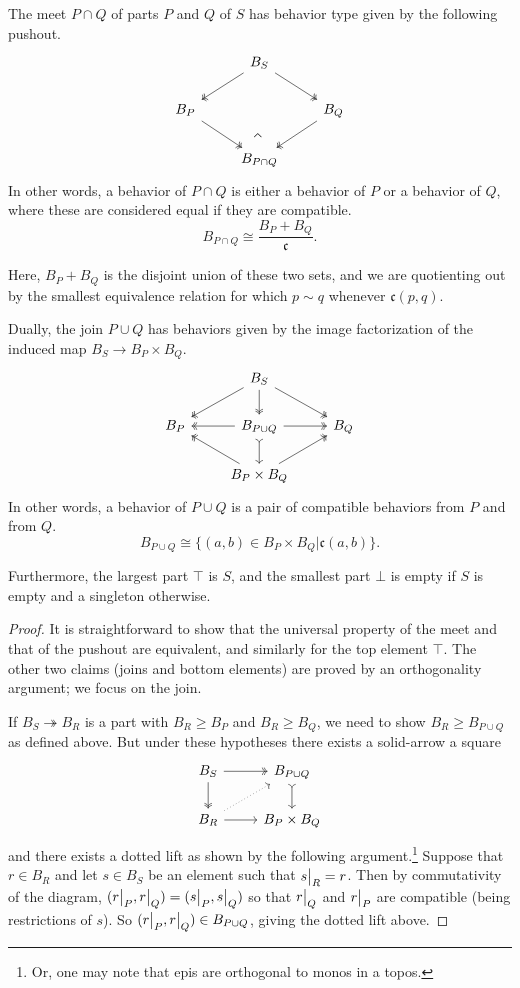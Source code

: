 \begin{prop}
The meet $P \cap Q$ of parts $P$ and $Q$ of $S$ has behavior type given by the following pushout.
\[
\begin{tikzcd}
 & B_S \arrow[ld, two heads] \arrow[rd, two heads] &  \\
B_P \arrow[rd, two heads] &  & B_Q \arrow[ld, two heads] \\
 & B_{P \cap Q} \ar[uu, phantom, very near start, "\rotatebox{45}{$\urcorner$}"]& 
\end{tikzcd}
\]
In other words, a behavior of $P \cap Q$ is either a behavior of $P$ or a behavior of $Q$, where these are considered equal if they are compatible.
$$B_{P \cap Q} \cong \frac{B_P + B_Q}{\mathfrak{c}}.$$

Here, $B_P + B_Q$ is the disjoint union of these two sets, and we are
quotienting out by the smallest equivalence relation for which $p \sim q$
whenever $\mathfrak{c}(p, q)$.

Dually, the join $P \cup Q$ has behaviors given by the image factorization of the induced map $B_S \to B_P \times B_Q$.
\[
\begin{tikzcd}
 & B_S \arrow[ld, two heads] \arrow[rd, two heads]\ar[d, two heads] &  \\
B_P & B_{P\cup Q}\ar[l, two heads]\ar[r, two heads]\ar[d, tail] & B_Q  \\
 & B_P\times B_Q\ar[ul, two heads]\ar[ur, two heads] 
\end{tikzcd}
\]
In other words, a behavior of $P \cup Q$ is a pair of compatible behaviors from $P$ and from $Q$.
$$B_{P \cup Q} \cong \{(a, b) \in B_P \times B_Q | \mathfrak{c}(a, b)\}.$$

Furthermore, the largest part $\top$ is $S$, and the smallest part $\bot$ is
empty if $S$ is empty and a singleton otherwise.
\end{prop}
\begin{proof}
It is straightforward to show that the universal property of the meet and that of the pushout are equivalent, and similarly for the top element $\top$. The other two claims (joins and bottom elements) are proved by an orthogonality argument; we focus on the join.

If $B_S\twoheadrightarrow B_R$ is a part with $B_R\geq B_P$ and $B_R\geq B_Q$, we need to show $B_R\geq B_{P\cup Q}$ as defined above. But under these hypotheses there exists a solid-arrow a square
\[
\begin{tikzcd}
    B_S\ar[r, two heads]\ar[d, two heads]&
    B_{P\cup Q}\ar[d, tail]\\
    B_R\ar[r]\ar[ur, dotted]&
    B_P\times B_Q
\end{tikzcd}
\]
and there exists a dotted lift as shown by the following argument.\footnote{Or,
  one may note that epis are orthogonal to monos in a topos.} Suppose that
$r \in B_R$ and let $s \in B_S$ be an element such that $s\big|_{R} = r$. Then
by commutativity of the diagram, $(r\big|_{P}, r\big|_{Q}) = (s\big|_{P},
s\big|_{Q})$ so that $r\big|_{Q}$ and $r\big|_{P}$ are compatible (being
restrictions of $s$). So $(r\big|_{P},r\big|_{Q}) \in B_{P \cup Q}$, giving
the dotted lift above.
\end{proof}


